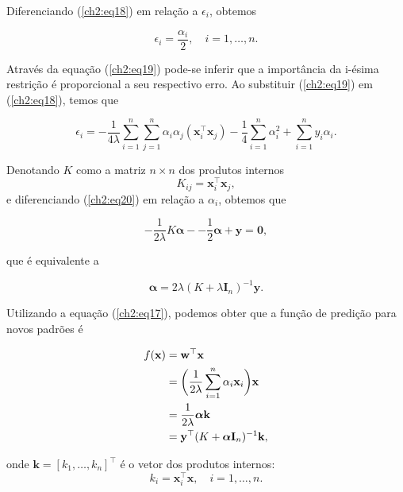 \noindent Diferenciando (\ref{ch2:eq18}) em relação a $\epsilon_i$, obtemos

\begin{equation}
    \label{ch2:eq19}
    \epsilon_i = \frac{\alpha_i}{2}, \quad i=1,\ldots,n.
\end{equation}

\noindent Através da equação (\ref{ch2:eq19}) pode-se inferir que a importância da i-ésima restrição é proporcional a seu respectivo erro. Ao substituir (\ref{ch2:eq19}) em (\ref{ch2:eq18}), temos que

\begin{equation}
    \label{ch2:eq20}
    \epsilon_i = -\frac{1}{4\lambda} \sum_{i=1}^{n} \sum_{j=1}^{n} \alpha_i \alpha_j (\mathbf{x}_i^{\top} \mathbf{x}_j) -\frac{1}{4} \sum_{i=1}^{n} \alpha_i^2 + \sum_{i=1}^{n} y_i \alpha_i.
\end{equation}

\noindent Denotando $K$ como a matriz $n \times n$ dos produtos internos \[ K_{ij} = \mathbf{x}_i^{\top}\mathbf{x}_j, \] e diferenciando (\ref{ch2:eq20}) em relação a $\alpha_i$, obtemos que

\begin{equation}
    \label{ch2:eq21}
    -\frac{1}{2\lambda} K\boldsymbol{\alpha} - -\frac{1}{2} \boldsymbol{\alpha} + \mathbf{y} = \mathbf{0},
\end{equation}

\noindent que é equivalente a 

\begin{equation}
    \label{ch2:eq22}
    \boldsymbol{\alpha} = 2\lambda(K + \lambda\mathbf{I}_n)^{-1}\mathbf{y}.
\end{equation}

\noindent Utilizando a equação (\ref{ch2:eq17}), podemos obter que a função de predição para novos padrões é

\begin{align}
    \label{ch2:eq23}
    f(\mathbf{x}) 
    &= \mathbf{w}^{\top}\mathbf{x} \notag \\
    &= \bigg{(} \frac{1}{2\lambda} \sum_{i=1}^{n} \alpha_i \mathbf{x}_i \bigg{)} \mathbf{x} \notag \\
    &= \frac{1}{2\lambda} \boldsymbol{\alpha} \mathbf{k} \notag \\
    &= \mathbf{y}^{\top}(K + \boldsymbol{\alpha}\mathbf{I}_n)^{-1}\mathbf{k},
\end{align}

\noindent onde $\mathbf{k} = [k_1,\ldots,k_n]^{\top}$ é o vetor dos produtos internos: \[ k_i = \mathbf{x}_i^{\top}\mathbf{x}, \quad i = 1,\ldots,n. \]

